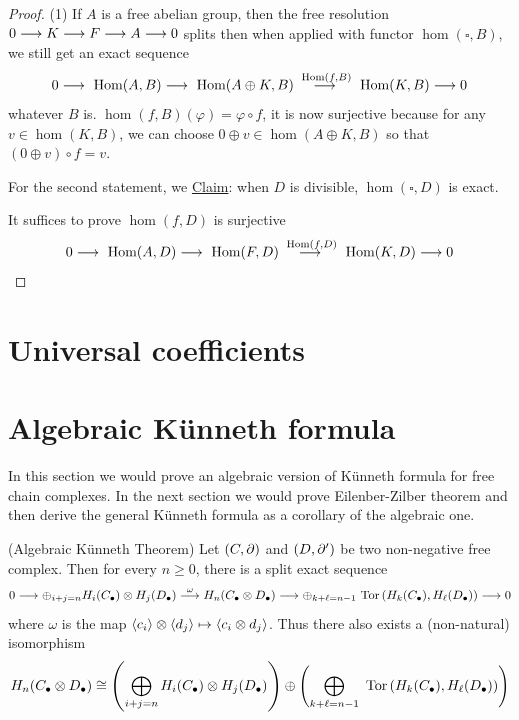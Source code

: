 \documentclass[11pt]{book} %
\begin{document}
\begin{proof}
 (1) If $A$ is a free abelian group, then the free resolution $0\longrightarrow K\longrightarrow F\longrightarrow A\longrightarrow 0$ splits then when applied with functor $\hom(\square, B)$, we still get an exact sequence
 $$
0\longrightarrow \text{ Hom}(A, B)\longrightarrow \text{ Hom}(A\oplus K,B) \overset{\text{ Hom}(f,B)}{\longrightarrow} \text{ Hom}(K,B)\longrightarrow 0
$$
 whatever $B$ is. $\hom(f,B)(\varphi)=\varphi\circ f$, it is now surjective because for any $v\in \hom(K,B)$, we can choose $0\oplus v\in\hom(A\oplus K, B)$ so that $(0\oplus v)\circ f=v$.

 For the second statement, we \underline{Claim}: when $D$ is divisible, $\hom(\square, D)$ is exact.

 It suffices to prove $\hom(f, D)$ is surjective
$$
0\longrightarrow \text{ Hom}(A, D)\longrightarrow \text{ Hom}(F,D) \overset{\text{ Hom}(f,D)}{\longrightarrow} \text{ Hom}(K,D)\longrightarrow 0
$$
\end{proof}

\section{Universal coefficients}
\section{Algebraic K\"unneth formula}
In this section
we would prove an algebraic version of K\"unneth formula for free chain complexes. In the next section we would prove Eilenber-Zilber theorem and then derive the general K\"unneth formula as a corollary of the algebraic one. 
\begin{theorem}\label{chap11thm:Algebraic_Kuenneth_formula}
(Algebraic K\"unneth Theorem) Let $(C,{\partial})$ and $(D,{\partial}')$ be two non-negative free complex. Then for every $n\geq 0$, there is a split exact sequence
$$
0\longrightarrow \oplus_{i+j=n}H_i(C_\bullet)\otimes H_j(D_\bullet)\overset{\omega}{\longrightarrow} H_n(C_\bullet\otimes D_\bullet)\longrightarrow \oplus_{k+\ell=n-1}\text{ Tor\,}(H_k(C_\bullet),H_\ell(D_\bullet))\longrightarrow 0
$$
where $\omega$ is the map $\langle c_i\rangle\otimes \langle d_j\rangle\mapsto \langle c_i\otimes d_j\rangle$. 
Thus there also exists a (non-natural) isomorphism 
$$
H_n(C_\bullet\otimes D_\bullet)\cong \left(\bigoplus_{i+j=n}H_i(C_\bullet)\otimes H_j (D_\bullet)\right)\oplus\left(\bigoplus_{k+\ell=n-1} \text{ Tor\,}(H_k(C_\bullet),H_\ell(D_\bullet))\right)
$$
\end{theorem}
\end{document}

